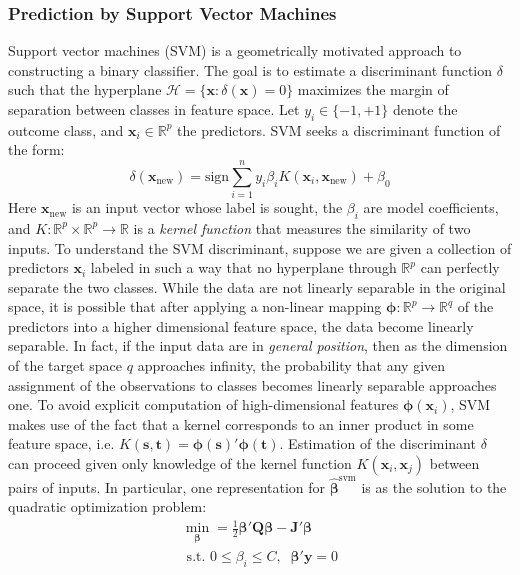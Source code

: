 \documentclass[a4paper]{article}
\begin{document}
\subsubsection{Prediction by Support Vector Machines}
Support vector machines (SVM) is a geometrically motivated approach to constructing a binary classifier. The goal is to estimate a discriminant function $\delta$ such that the hyperplane $\mathcal{H} = \{\bm{x} : \delta(\bm{x}) = 0\}$ maximizes the margin of separation between classes in feature space. Let $y_{i}\in\{-1,+1\}$ denote the outcome class, and $\bm{x}_{i} \in \mathbb{R}^{p}$ the predictors. SVM seeks a discriminant function of the form:
\begin{equation}
\delta(\bm{x}_{\text{new}}) = \text{sign}\sum_{i=1}^{n}y_{i}\beta_{i}K(\bm{x}_{i},\bm{x}_{\text{new}}) + \beta_{0}
\end{equation}
Here $\bm{x}_{\text{new}}$ is an input vector whose label is sought, the $\beta_{i}$ are model coefficients, and $K:\mathbb{R}^{p}\times\mathbb{R}^{p}\to\mathbb{R}$ is a \textit{kernel function} that measures the similarity of two inputs. To understand the SVM discriminant, suppose we are given a collection of predictors $\bm{x}_{i}$ labeled in such a way that no hyperplane through $\mathbb{R}^{p}$ can perfectly separate the two classes. While the data are not linearly separable in the original space, it is possible that after applying a non-linear mapping $\bm{\phi}:\mathbb{R}^{p} \to \mathbb{R}^{q}$ of the predictors into a higher dimensional feature space, the data become linearly separable. In fact, if the input data are in \textit{general position}, then as the dimension of the target space $q$ approaches infinity, the probability that any given assignment of the observations to classes becomes linearly separable approaches one. To avoid explicit computation of high-dimensional features $\bm{\phi}(\bm{x}_{i})$, SVM makes use of the fact that a kernel corresponds to an inner product in some feature space, i.e. $K(\bm{s},\bm{t}) = \bm{\phi}(\bm{s})'\bm{\phi}(\bm{t})$. Estimation of the discriminant $\delta$ can proceed given only knowledge of the kernel function $K(\bm{x}_{i},\bm{x}_{j})$ between pairs of inputs. In particular, one representation for $\bm{\hat{\beta}}^{\text{svm}}$ is as the solution to the quadratic optimization problem:
\begin{gather}
\min_{\bm{\beta}} = \frac{1}{2}\bm{\beta}'\bm{Q}\bm{\beta} - \bm{J}'\bm{\beta} \\
\text{ s.t. } 0 \leq \beta_{i} \leq C, \;\; \bm{\beta}'\bm{y} = 0 
\end{gather}
\end{document}
